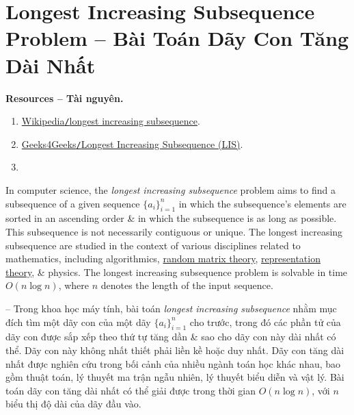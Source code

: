 \documentclass{article}
\begin{document}
\section{Longest Increasing Subsequence Problem -- Bài Toán Dãy Con Tăng Dài Nhất}
\textbf{\textsf{Resources -- Tài nguyên.}}
\begin{enumerate}
    \item \href{https://en.wikipedia.org/wiki/Longest_increasing_subsequence}{Wikipedia{\tt/}longest increasing subsequence}.

    \item \href{https://www.geeksforgeeks.org/dsa/longest-increasing-subsequence-dp-3/}{Geeks4Geeks{\tt/}Longest Increasing Subsequence (LIS)}.

    \item
\end{enumerate}
In computer science, the {\it longest increasing subsequence} problem aims to find a subsequence of a given sequence $\{a_i\}_{i=1}^n$ in which the subsequence's elements are sorted in an ascending order \& in which the subsequence is as long as possible. This subsequence is not necessarily contiguous or unique. The longest increasing subsequence are studied in the context of various disciplines related to mathematics, including algorithmics, \href{https://en.wikipedia.org/wiki/Random_matrix_theory}{random matrix theory}, \href{https://en.wikipedia.org/wiki/Representation_theory}{representation theory}, \& physics. The longest increasing subsequence problem is solvable in time $O(n\log n)$, where $n$ denotes the length of the input sequence.

-- Trong khoa học máy tính, bài toán {\it longest increasing subsequence} nhằm mục đích tìm một dãy con của một dãy $\{a_i\}_{i=1}^n$ cho trước, trong đó các phần tử của dãy con được sắp xếp theo thứ tự tăng dần \& sao cho dãy con này dài nhất có thể. Dãy con này không nhất thiết phải liền kề hoặc duy nhất. Dãy con tăng dài nhất được nghiên cứu trong bối cảnh của nhiều ngành toán học khác nhau, bao gồm thuật toán, lý thuyết ma trận ngẫu nhiên, lý thuyết biểu diễn và vật lý. Bài toán dãy con tăng dài nhất có thể giải được trong thời gian $O(n\log n)$, với $n$ biểu thị độ dài của dãy đầu vào.
\end{document}
